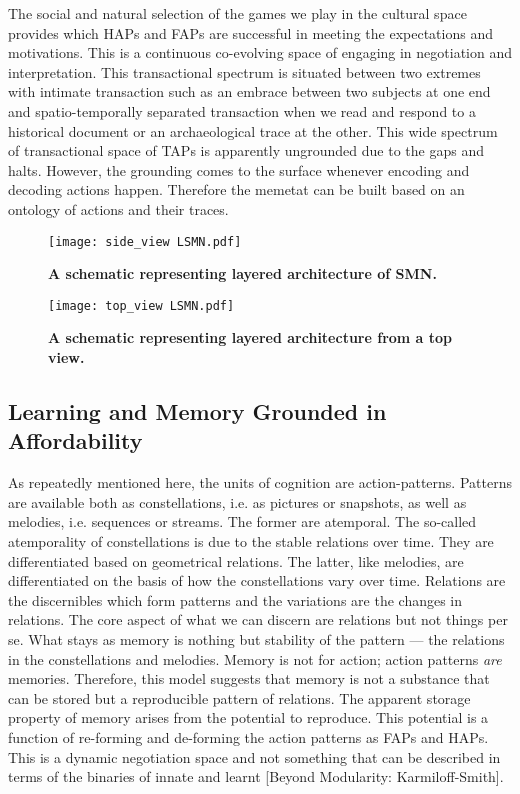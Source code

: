 The social and natural selection of the games we play in the cultural space provides which HAPs and FAPs are successful in meeting the expectations and motivations. This is a continuous co-evolving space of engaging in negotiation and interpretation. This transactional spectrum is situated between two extremes with intimate transaction such as an embrace between two subjects at one end and spatio-temporally separated transaction when we read and respond to a historical document or an archaeological trace at the other. This wide spectrum of transactional space of TAPs is apparently ungrounded due to the gaps and halts. However, the grounding comes to the surface whenever encoding and decoding actions happen. Therefore the memetat can be built based on an ontology of actions and their traces.

\begin{figure}[ht] 
\texttt{[image: side\_view LSMN.pdf]}
\caption{\color{Gray} \textbf{A schematic representing layered architecture of SMN.}}
\label{side_view_lSMN} %
\end{figure}

\begin{figure}[ht] 
\texttt{[image: top\_view LSMN.pdf]}
\caption{\color{Gray} \textbf{A schematic representing layered architecture from a top view.}}
\label{top_view_lSMN} %
\end{figure}

\subsection{Learning and Memory Grounded in Affordability}
As repeatedly mentioned here, the units of cognition are action-patterns. Patterns are available both as constellations, i.e. as pictures or snapshots, as well as melodies, i.e. sequences or streams. The former are atemporal. The so-called atemporality of constellations is due to the stable relations over time. They are differentiated based on geometrical relations. The latter, like melodies, are differentiated on the basis of how the constellations vary over time. Relations are the discernibles which form patterns and the variations are the changes in relations. The core aspect of what we can discern are relations but not things per se. What stays as memory is nothing but stability of the pattern --- the relations in the constellations and melodies. Memory is not for action; action patterns \textit{are} memories. Therefore, this model suggests that memory is not a substance that can be stored but a reproducible pattern of relations. The apparent storage property of memory arises from the potential to reproduce.
This potential is a function of re-forming and de-forming the action patterns as FAPs and HAPs. This is a dynamic negotiation space and not something that can be described in terms of the binaries of innate and learnt [Beyond Modularity: Karmiloff-Smith].

